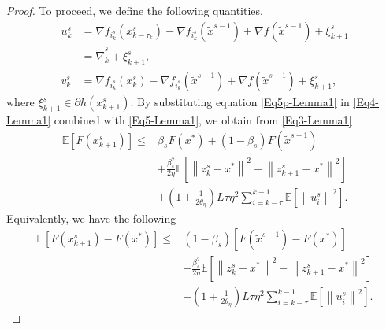 \documentclass[conference]{IEEEtran}
\newcommand*{\E}{\mathbb{E}}
\newcommand{\norm}[1]{\left\lVert#1\right\rVert}
\theoremstyle{definition}
\theoremstyle{remark}
\begin{document}
\begin{proof}
To proceed, we define the following quantities,
\begin{equation*}
\begin{split}
u_k^s &= \nabla f_{i_k^s}(x_{k-\tau_k}^s) - \nabla f_{i_k^s}(\widetilde{x}^{s-1}) + \nabla f(\widetilde{x}^{s-1})+{\xi}_{k+1}^s \\
&= {\widetilde{\nabla}_{k}^s}+{\xi}_{k+1}^s,\\
v_k^s &= \nabla f_{i_k^s}(x_{k}^s) - \nabla f_{i_k^s}(\widetilde{x}^{s-1}) + \nabla f(\widetilde{x}^{s-1})+{\xi}_{k+1}^s,
\end{split}
\end{equation*}
where ${\xi}_{k+1}^s\in\partial h(x_{k+1}^s)$. By substituting equation \eqref{Eq5p-Lemma1} in \eqref{Eq4-Lemma1} combined with \eqref{Eq5-Lemma1}, we obtain from \eqref{Eq3-Lemma1}
\begin{equation}
\begin{split}
\E[F(x_{k+1}^s)] \leq &\beta_s F(x^*)+(1-\beta_s)F(\widetilde{x}^{s-1})\\
&+ {\frac{\beta_s^2}{2\eta}}\E[\norm{z_{k}^s-x^*}^2-\norm{z_{k+1}^s-x^*}^2]\\
&+(1+\frac{1}{2\theta_{\eta}})L\tau\eta^2\sum_{i = k-\tau}^{k-1}\E[\norm{u_{i}^s}^2]. 
\end{split}
\end{equation}
Equivalently, we have the following
\begin{equation}\label{main-ine-Lemma1}
\begin{split}
\E[F(x_{k+1}^s)-F(x^*)] \leq &(1-\beta_s)[F(\widetilde{x}^{s-1})-F(x^*)] \\
&+ {\frac{ \beta_s^2}{2\eta}}\E[\norm{z_{k}^s-x^*}^2-\norm{z_{k+1}^s-x^*}^2]\\
&+(1+\frac{1}{2\theta_{\eta}})L\tau\eta^2\sum_{i = k-\tau}^{k-1}\E[\norm{u_{i}^s}^2]. 
\end{split}
\end{equation}


\end{proof}
\end{document}
